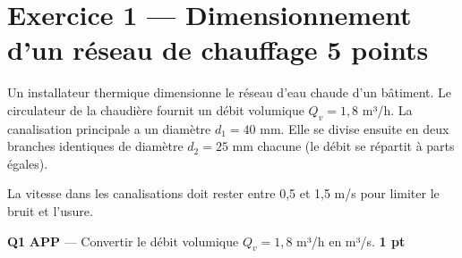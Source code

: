\documentclass[a4paper,11pt]{article}
\newcommand{\pts}[1]{\hfill\textcolor{gris}{\small\textbf{#1}}}
\newcommand{\comp}[1]{\colorbox{blue!10}{\scriptsize\textbf{#1}}}
\begin{document}
\newpage

\section*{Exercice 1 — Dimensionnement d'un réseau de chauffage \pts{5 points}}

\begin{contextebox}
Un installateur thermique dimensionne le réseau d'eau chaude d'un bâtiment. Le circulateur de la chaudière fournit un débit volumique $Q_v = 1{,}8$ m³/h. La canalisation principale a un diamètre $d_1 = 40$ mm. Elle se divise ensuite en deux branches identiques de diamètre $d_2 = 25$ mm chacune (le débit se répartit à parts égales).

La vitesse dans les canalisations doit rester entre 0,5 et 1,5 m/s pour limiter le bruit et l'usure.
\end{contextebox}

\begin{center}
\end{center}

\textbf{Q1} \comp{APP} — Convertir le débit volumique $Q_v = 1{,}8$ m³/h en m³/s. \pts{1 pt}

\begin{reponsebox}[2.5cm]
\dotfill

\dotfill
\end{reponsebox}
\end{document}
